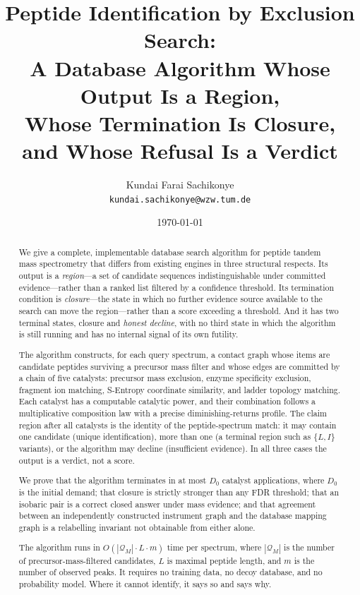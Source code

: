 \documentclass[11pt,a4paper]{article}
\title{\textbf{Peptide Identification by Exclusion Search:\\[2pt]
A Database Algorithm Whose Output Is a Region,\\
Whose Termination Is Closure,\\
and Whose Refusal Is a Verdict}}
\author{Kundai Farai Sachikonye\\
\texttt{kundai.sachikonye@wzw.tum.de}}
\date{\today}
\theoremstyle{definition}
\theoremstyle{remark}
\newcommand{\Pep}{\mathcal{Q}}
\begin{document}
\maketitle

\begin{abstract}
\noindent
We give a complete, implementable database search algorithm for peptide
tandem mass spectrometry that differs from existing engines in three
structural respects. Its output is a \emph{region}---a set of candidate
sequences indistinguishable under committed evidence---rather than a
ranked list filtered by a confidence threshold. Its termination
condition is \emph{closure}---the state in which no further evidence
source available to the search can move the region---rather than a score
exceeding a threshold. And it has two terminal states, closure and
\emph{honest decline}, with no third state in which the algorithm is
still running and has no internal signal of its own futility.

The algorithm constructs, for each query spectrum, a contact graph whose
items are candidate peptides surviving a precursor mass filter and whose
edges are committed by a chain of five catalysts: precursor mass
exclusion, enzyme specificity exclusion, fragment ion matching,
S-Entropy coordinate similarity, and ladder topology matching. Each
catalyst has a computable catalytic power, and their combination follows
a multiplicative composition law with a precise diminishing-returns
profile. The claim region after all catalysts is the identity of the
peptide-spectrum match: it may contain one candidate (unique
identification), more than one (a terminal region such as $\{L,I\}$
variants), or the algorithm may decline (insufficient evidence). In all
three cases the output is a verdict, not a score.

We prove that the algorithm terminates in at most $D_0$ catalyst
applications, where $D_0$ is the initial demand; that closure is
strictly stronger than any FDR threshold; that an isobaric pair is a
correct closed answer under mass evidence; and that agreement between an
independently constructed instrument graph and the database mapping
graph is a relabelling invariant not obtainable from either alone.

The algorithm runs in $O(|\Pep_M| \cdot L \cdot m)$ time per spectrum,
where $|\Pep_M|$ is the number of precursor-mass-filtered candidates,
$L$ is maximal peptide length, and $m$ is the number of observed peaks.
It requires no training data, no decoy database, and no probability
model. Where it cannot identify, it says so and says why.
\end{abstract}
\end{document}

